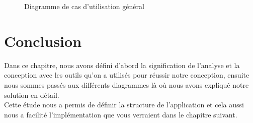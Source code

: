 \documentclass[12pt]{report}
\begin{document}
\begin{figure}[h]
\centering
  \vspace{-0.1in}
    \centerline{}
    \caption{Diagramme de cas d’utilisation général}
\end{figure}

\newpage

\section{Conclusion}
Dans ce chapitre, nous avons défini d’abord la signification de l’analyse et la conception avec les outils qu’on a utilisés pour réussir notre conception, ensuite nous sommes passés aux différents diagrammes là où nous avons expliqué notre solution en détail. 
\\
Cette étude nous a permis de définir la structure de l’application et cela aussi nous a facilité l’implémentation que vous verraient dans le chapitre suivant.
\end{document}
